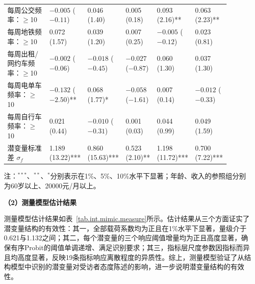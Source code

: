 \begin{landscape}
{\begin{longtable}{L{0.20\linewidth}C{0.14\linewidth}C{0.14\linewidth}C{0.14\linewidth}C{0.14\linewidth}C{0.14\linewidth}}
每周公交频率：$\geq$10     & $-0.005$ ($-0.11$) & 0.046 (1.40)   & 0.005 (0.18)     & 0.093 (2.16)**   & 0.063 (2.23)**  \\
每周地铁频率：$\geq$10     & 0.072 (1.57)     & 0.039 (1.20)     & 0.007 (0.25)     & $-0.005$ ($-0.12$) & 0.023 (0.81)  \\
每周出租/网约车频率：$\geq$10 & $-0.002$ ($-0.06$) & $-0.018$ ($-0.45$) & $-0.027$ ($-0.87$) & 0.060 (1.30) & 0.037 (1.30)  \\
每周电单车频率：$\geq$10   & $-0.132$ ($-2.50$)** & 0.068 (1.77)* & $-0.058$ ($-1.61$) & 0.007 (0.14) & $-0.012$ ($-0.33$) \\
每周自行车频率：$\geq$10   & 0.021 (0.44)     & $-0.010$ ($-0.31$) & 0.001 (0.03)   & 0.044 (0.99)     & 0.049 (1.59)    \\
\midrule
潜变量标准差 $\sigma_f$    & 1.189 (13.22)*** & 0.860 (15.63)*** & 0.523 (2.10)**   & 1.198 (11.72)*** & 0.700 (7.22)*** \\
\end{longtable}

{\footnotesize 注：$^{***}$、$^{**}$、$^{*}$分别表示在1\%、5\%、10\%水平下显著；年龄、收入的参照组分别为60岁以上、20000元/月以上。}
}
\end{landscape}

\textbf{（2）测量模型估计结果}

测量模型估计结果如表~\ref{tab.int.mimic.measure}所示。估计结果从三个方面证实了潜变量结构的有效性：其一，全部载荷系数均为正且在1\%水平下显著，量级介于0.621与1.132之间；其二，每个潜变量的三个响应阈值增量均为正且高度显著，确保有序Probit的阈值单调递增、满足识别要求；其三，指标层尺度参数因指标而异且均高度显著，反映19条指标响应离散程度的异质性。综上，测量模型验证了从结构模型中识别的潜变量对受访者态度陈述的影响，进一步说明潜变量结构的有效性。

